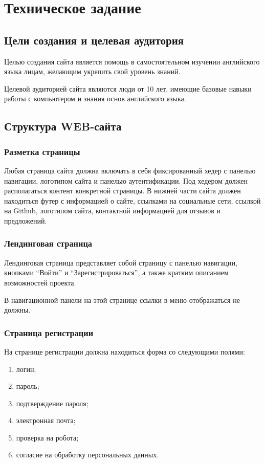 \documentclass[a4paper,14pt]{extarticle}
\begin{document}


\section{Техническое задание}
\subsection{Цели создания и целевая аудитория}
Целью создания сайта является помощь в самостоятельном изучении английского языка
лицам, желающим укрепить свой уровень знаний.

Целевой аудиторией сайта являются люди от 10 лет, имеющие базовые навыки работы с
компьютером и знания основ английского языка.

\subsection{Структура WEB-сайта}
\subsubsection{Разметка страницы}
Любая страница сайта должна включать в себя фиксированный хедер с панелью навигации, логотипом сайта и панелью аутентификации.
Под хедером должен располагаться контент конкретной страницы. В нижней части сайта должен находиться футер с информацией о сайте,
ссылками на социальные сети, ссылкой на Github, логотипом сайта, контактной информацией для отзывов и предложений.
\subsubsection{Лендинговая страница}
Лендинговая страница представляет собой страницу с панелью навигации, кнопками \enquote{Войти}
и \enquote{Зарегистрироваться}, а также кратким описанием возможностей проекта.

В навигационной панели на этой странице ссылки в меню отображаться не должны.

\subsubsection{Страница регистрации}
На странице регистрации должна находиться форма со следующими полями:
\begin{enumerate}
    \item логин;
    \item пароль;
    \item подтверждение пароля;
    \item электронная почта;
    \item проверка на робота;
    \item согласие на обработку персональных данных.
\end{enumerate}
\end{document}
